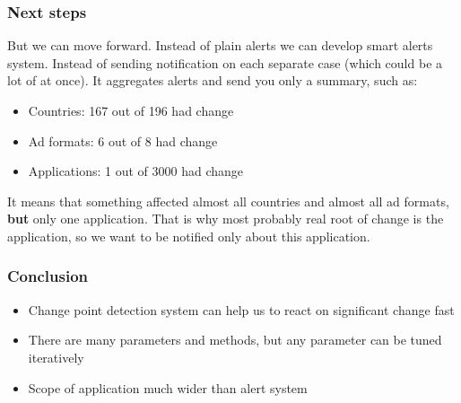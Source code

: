 \documentclass[intlimits, 9pt, unicode]{beamer}
\begin{document}
\begin{frame}
    \frametitle{Next steps}
    
But we can move forward. Instead of plain alerts we can develop smart alerts system.
Instead of sending notification on each separate case (which could be a lot of at once). It aggregates alerts and send you only a summary, such as:

 \begin{itemize}
	    	\item Countries: 167 out of 196 had change
		\item Ad formats: 6 out of 8 had change
		\item Applications: 1 out of 3000 had change
\end{itemize}

It means that something affected almost all countries and almost all ad formats, \textbf{but} only one application. That is why most probably real root of change is the application, so we want to be notified only about this application.

\end{frame}


\begin{frame}
    \frametitle{Conclusion}

	    \begin{itemize}
	    	\item Change point detection system can help us to react on significant change fast
		\item There are many parameters and methods, but any parameter can be tuned iteratively
		\item Scope of application much wider than alert system
	    \end{itemize}

 \end{frame}




\end{document}
